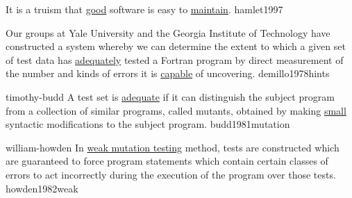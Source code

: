 \documentclass{article}
\begin{document}

  {It is a truism that \ul{good} software is easy to \ul{maintain}.}
  {hamlet1997}


  {Our groups at Yale University and the Georgia Institute of Technology have constructed a system whereby we can determine the extent to which a given set of test data has \ul{adequately} tested a Fortran program by direct measurement of the number and kinds of errors it is \ul{capable} of uncovering.}
  {demillo1978hints}

\qte
  {timothy-budd}
  {A test set is \ul{adequate} if it can distinguish the subject program from a collection of similar programs, called mutants, obtained by making \ul{small} syntactic modifications to the subject program.}
  {budd1981mutation}

\qte
  {william-howden}
  {In \ul{weak mutation testing} method, tests are constructed which are guaranteed to force program statements which contain certain classes of errors to act incorrectly during the execution of the program over those tests.}
  {howden1982weak}
\end{document}
